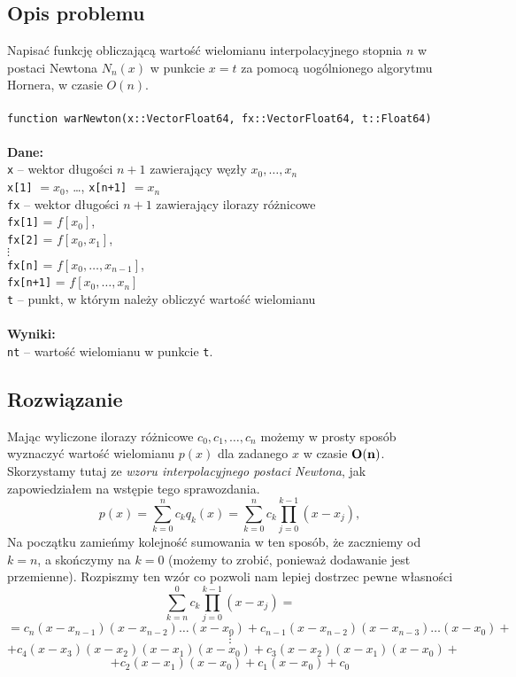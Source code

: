 \documentclass[a4paper]{article}
\newcommand\tab[1][1cm]{\hspace*{#1}}
\begin{document}
    \subsection{Opis problemu}
    Napisać funkcję obliczającą wartość wielomianu interpolacyjnego stopnia $n$ w postaci Newtona $N_n(x)$ w punkcie $x = t$ za pomocą uogólnionego algorytmu Hornera, w czasie $O(n)$. \\\\
    \texttt{function warNewton(x::Vector{Float64}, fx::Vector{Float64}, t::Float64)} \\\\
    \textbf{Dane:}\\
    \texttt{x} – wektor długości $n + 1$ zawierający węzły $x_0, \dots, x_n$ \\
    \tab \texttt{x[1]} $ = x_0$, \dots, \texttt{x[n+1]} $ = x_n$ \\
    \texttt{fx} – wektor długości $n + 1$ zawierający ilorazy różnicowe \\
    \tab \texttt{fx[1]} = $f[x_0]$, \\
    \tab \texttt{fx[2]} = $f[x_0, x_1]$, \\
    \tab $\vdots$ \\
    \tab \texttt{fx[n]} = $f[x_0, \dots, x_{n-1}]$, \\
    \tab \texttt{fx[n+1]} = $f[x_0, \dots, x_n]$ \\
    \texttt{t} – punkt, w którym należy obliczyć wartość wielomianu \\\\
    \textbf{Wyniki:}\\
    \texttt{nt} – wartość wielomianu w punkcie \texttt{t}.
    
    \subsection{Rozwiązanie}

    Mając wyliczone ilorazy różnicowe $c_0,c_1, \dots , c_n$ możemy w prosty sposób wyznaczyć wartość wielomianu $p(x)$ dla zadanego $x$ w czasie $\bold{O(n)}$. Skorzystamy tutaj ze \emph{wzoru interpolacyjnego postaci Newtona}, jak zapowiedziałem na wstępie tego sprawozdania.
    \[ p(x) = \sum_{k=0}^n c_kq_k(x) = \sum_{k=0}^n c_k \prod_{j=0}^{k-1} (x - x_j),\]
    Na początku zamieńmy kolejność sumowania w ten sposób, że zaczniemy od $k=n$, a skończymy na $k=0$ (możemy to zrobić, ponieważ dodawanie jest przemienne). Rozpiszmy ten wzór co pozwoli nam lepiej dostrzec pewne własności
    \[ \sum_{k=n}^0 c_k \prod_{j=0}^{k-1} (x - x_j) = \] 
    \[ = c_n(x - x_{n-1})(x-x_{n-2})\dots(x - x_{0}) + c_{n-1}(x - x_{n-2})(x-x_{n-3})\dots(x - x_{0}) +\]
    \[ \vdots \]
    \[ + c_4(x-x_3)(x-x_2)(x-x_1)(x-x_0) + c_3(x-x_2)(x-x_1)(x-x_0) +\]
    \[ + c_2(x-x_1)(x-x_0) + c_1(x-x_0) + c_0\]
\end{document}
